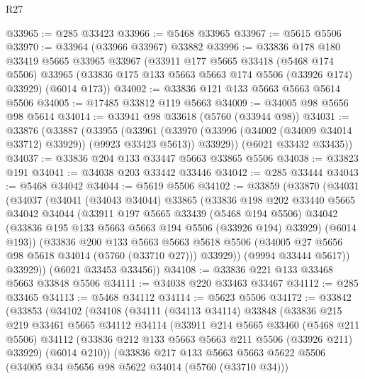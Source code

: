 \begin{lexlean}{R27}
\begin{coremodule}
@33965 := @285 @33423
@33966 := @5468 @33965
@33967 := @5615 @5506
@33970 := @33964 (@33966 @33967) @33882
@33996 := @33836
    @178
    @180
    @33419
    @5665
    @33965
    @33967
    (@33911
      @177
      @5665
      @33418
      (@5468 @174 @5506)
      @33965
      (@33836 @175 @133 @5663 @5663 @174 @5506 (@33926 @174) @33929)
      (@6014 @173))
@34002 := @33836 @121 @133 @5663 @5663 @5614 @5506
@34005 := @17485 @33812 @119 @5663
@34009 := @34005 @98 @5656 @98 @5614
@34014 := @33941 @98 @33618 (@5760 (@33944 @98))
@34031 := @33876
    (@33887
      (@33955
        (@33961
          (@33970 (@33996 (@34002 (@34009 @34014 @33712) @33929)) (@9923 @33423 @5613))
          @33929))
      (@6021 @33432 @33435))
@34037 := @33836 @204 @133 @33447 @5663 @33865 @5506
@34038 := @33823 @191
@34041 := @34038 @203 @33442 @33446
@34042 := @285 @33444
@34043 := @5468 @34042
@34044 := @5619 @5506
@34102 := @33859
    (@33870
      (@34031
        (@34037
          (@34041
            (@34043 @34044)
            @33865
            (@33836
              @198
              @202
              @33440
              @5665
              @34042
              @34044
              (@33911
                @197
                @5665
                @33439
                (@5468 @194 @5506)
                @34042
                (@33836 @195 @133 @5663 @5663 @194 @5506 (@33926 @194) @33929)
                (@6014 @193))
              (@33836
                @200
                @133
                @5663
                @5663
                @5618
                @5506
                (@34005 @27 @5656 @98 @5618 @34014 (@5760 (@33710 @27)))
                @33929))
            (@9994 @33444 @5617))
          @33929))
      (@6021 @33453 @33456))
@34108 := @33836 @221 @133 @33468 @5663 @33848 @5506
@34111 := @34038 @220 @33463 @33467
@34112 := @285 @33465
@34113 := @5468 @34112
@34114 := @5623 @5506
@34172 := @33842
    (@33853
      (@34102
        (@34108
          (@34111
            (@34113 @34114)
            @33848
            (@33836
              @215
              @219
              @33461
              @5665
              @34112
              @34114
              (@33911
                @214
                @5665
                @33460
                (@5468 @211 @5506)
                @34112
                (@33836 @212 @133 @5663 @5663 @211 @5506 (@33926 @211) @33929)
                (@6014 @210))
              (@33836
                @217
                @133
                @5663
                @5663
                @5622
                @5506
                (@34005 @34 @5656 @98 @5622 @34014 (@5760 (@33710 @34)))

\end{coremodule}
\end{lexlean}
